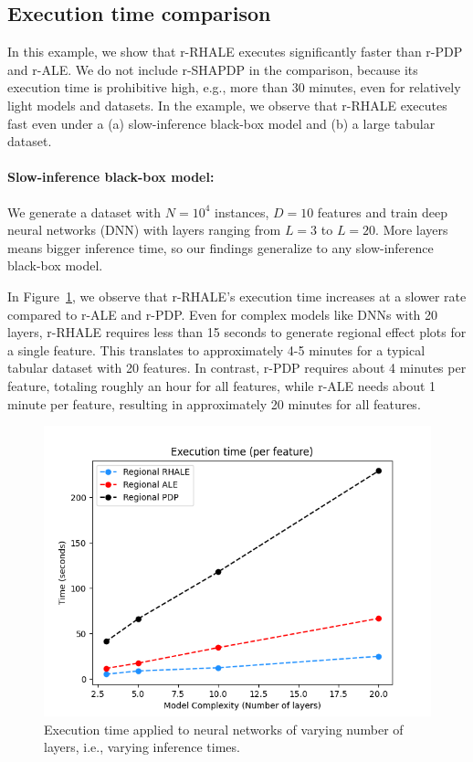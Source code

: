 \documentclass[
twocolumn,
]{ceurart}
\begin{document}
\subsection{Execution time comparison}
\label{sec:efficiency}


In this example, we show that r-RHALE executes significantly faster than r-PDP and r-ALE.
We do not include r-SHAPDP in the comparison, because its execution time is prohibitive high, e.g., more than 30 minutes, even for relatively light models and datasets. In the example, we observe that r-RHALE executes fast even under a (a) slow-inference black-box model and (b) a large tabular dataset.

\paragraph{Slow-inference black-box model:}

We generate a dataset with $N=10^4$ instances, $D=10$ features and train deep neural networks (DNN) with layers ranging from $L=3$ to $L=20$. More layers means bigger inference time, so our findings generalize to any slow-inference black-box model.

In Figure~\ref{fig:efficiency_heavy_model}, we observe that r-RHALE's execution time increases at a slower rate compared to r-ALE and r-PDP. Even for complex models like DNNs with 20 layers, r-RHALE requires less than 15 seconds to generate regional effect plots for a single feature. This translates to approximately 4-5 minutes for a typical tabular dataset with 20 features. In contrast, r-PDP requires about 4 minutes per feature, totaling roughly an hour for all features, while r-ALE needs about 1 minute per feature, resulting in approximately 20 minutes for all features.

\begin{figure}
    \centering
    \includegraphics[width=.49\textwidth]{figures/simulation_2/efficiency_layers.png}
    \caption{Execution time applied to neural networks of varying number of layers, i.e., varying inference times.}
    \label{fig:efficiency_heavy_model}
\end{figure}
\end{document}
